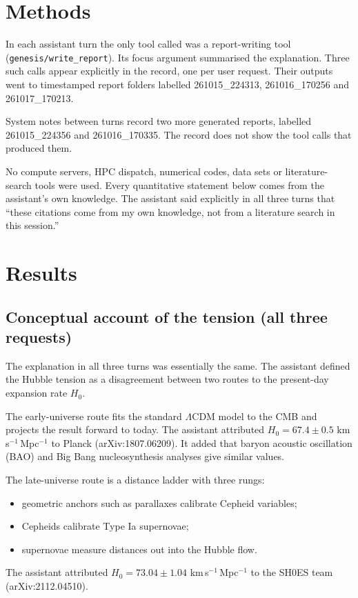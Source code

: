 \documentclass[11pt,a4paper]{article}
\begin{document}
\section{Methods}
In each assistant turn the only tool called was a report-writing tool (\texttt{genesis/write\_report}). Its focus argument summarised the explanation. Three such calls appear explicitly in the record, one per user request. Their outputs went to timestamped report folders labelled 261015\_224313, 261016\_170256 and 261017\_170213.

System notes between turns record two more generated reports, labelled 261015\_224356 and 261016\_170335. The record does not show the tool calls that produced them.

No compute servers, HPC dispatch, numerical codes, data sets or literature-search tools were used. Every quantitative statement below comes from the assistant's own knowledge. The assistant said explicitly in all three turns that ``these citations come from my own knowledge, not from a literature search in this session.''

\section{Results}
\subsection{Conceptual account of the tension (all three requests)}
The explanation in all three turns was essentially the same. The assistant defined the Hubble tension as a disagreement between two routes to the present-day expansion rate $H_0$.

The early-universe route fits the standard $\Lambda$CDM model to the CMB and projects the result forward to today. The assistant attributed $H_0 = 67.4 \pm 0.5$ km\,s$^{-1}$\,Mpc$^{-1}$ to Planck (arXiv:1807.06209). It added that baryon acoustic oscillation (BAO) and Big Bang nucleosynthesis analyses give similar values.

The late-universe route is a distance ladder with three rungs:
\begin{itemize}
\item geometric anchors such as parallaxes calibrate Cepheid variables;
\item Cepheids calibrate Type Ia supernovae;
\item supernovae measure distances out into the Hubble flow.
\end{itemize}
The assistant attributed $H_0 = 73.04 \pm 1.04$ km\,s$^{-1}$\,Mpc$^{-1}$ to the SH0ES team (arXiv:2112.04510).
\end{document}
